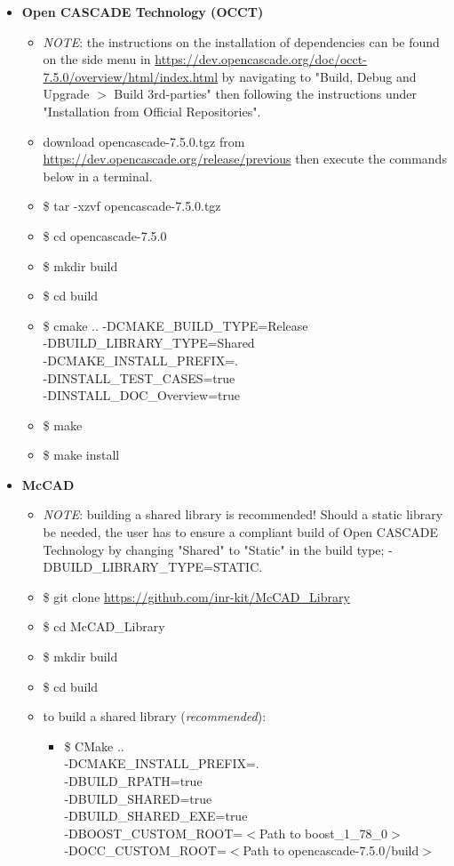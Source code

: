 \documentclass[12pt, a4paper, titlepage]{article}
\begin{document}
\begin{itemize}
      \item \textbf{Open CASCADE Technology (OCCT)}
      \begin{itemize}
        \item \emph{NOTE}: the instructions on the installation of dependencies can be found on the side menu in \url{https://dev.opencascade.org/doc/occt-7.5.0/overview/html/index.html} by navigating to "Build, Debug and Upgrade $>$ Build 3rd-parties" then following the instructions under "Installation from Official Repositories".
    	\item download opencascade-7.5.0.tgz from \url{https://dev.opencascade.org/release/previous} then execute the commands below in a terminal.
    	\item \$ tar -xzvf opencascade-7.5.0.tgz
    	\item \$ cd opencascade-7.5.0
    	\item \$ mkdir build
    	\item \$ cd build
    	\item \$ cmake .. -DCMAKE\_BUILD\_TYPE=Release \\-DBUILD\_LIBRARY\_TYPE=Shared \\-DCMAKE\_INSTALL\_PREFIX=. \\-DINSTALL\_TEST\_CASES=true \\-DINSTALL\_DOC\_Overview=true
    	\item \$ make
    	\item \$ make install
      \end{itemize}
	  \item \textbf{McCAD}
	  \begin{itemize}
		\item \emph{NOTE}: building a shared library is recommended! Should a static library be needed, the user has to ensure a compliant build of Open CASCADE Technology by changing "Shared" to "Static" in the build type; -DBUILD\_LIBRARY\_TYPE=STATIC.
		\item \$ git clone \url{https://github.com/inr-kit/McCAD_Library}
		\item \$ cd McCAD\_Library
		\item \$ mkdir build
		\item \$ cd build
		\item to build a shared library (\emph{recommended}):
		  \begin{itemize}
			\item \$ CMake .. \\-DCMAKE\_INSTALL\_PREFIX=. \\-DBUILD\_RPATH=true \\-DBUILD\_SHARED=true \\-DBUILD\_SHARED\_EXE=true \\-DBOOST\_CUSTOM\_ROOT=$<$Path to boost\_1\_78\_0$>$ \\-DOCC\_CUSTOM\_ROOT=$<$Path to opencascade-7.5.0/build$>$ 

\end{itemize}
\end{itemize}
\end{itemize}
\end{document}
